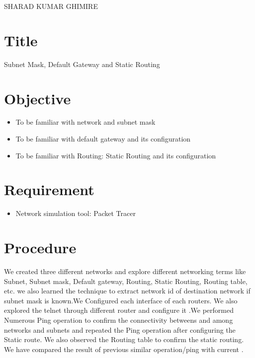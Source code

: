 \documentclass[a4paper,11pt]{article}
\begin{document}
{SHARAD KUMAR GHIMIRE}

\renewcommand{\contentsname}{Table of Contents}
\tableofcontents

\pagebreak
\lstlistoflistings
\pagebreak
\listoffigures
\pagebreak
{}

\section{Title} {\large Subnet Mask, Default Gateway and Static Routing}
\section{Objective}
\begin{itemize}
      \item To be familiar with network and subnet mask
      \item To be familiar with default gateway and its configuration
      \item To be familiar with Routing: Static Routing and its configuration
\end{itemize}
\section{Requirement}
\begin{itemize}
      \item Network simulation tool: Packet Tracer
\end{itemize}

\section{Procedure}

We created three different networks and explore different networking terms like Subnet, Subnet mask, Default gateway, Routing, Static Routing, Routing table, etc. we also learned the technique to extract network id of destination  network if subnet mask is known.We Configured each interface of each routers. We also explored the telnet through different router and configure it .We performed Numerous Ping operation to confirm the connectivity betweens and among networks and subnets and repeated the Ping operation after configuring the Static route. We also observed the Routing table to confirm the static routing. We have compared the result of previous similar operation/ping with current .
\end{document}

